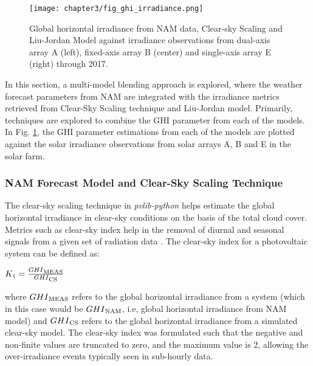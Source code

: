 \begin{figure}[ht]
    \begin{center}
    	\texttt{[image: chapter3/fig\_ghi\_irradiance.png]}
    	\caption[Global horizontal irradiance from NAM data, Clear-sky Scaling and Liu-Jordan against irradiance observations from arrays A, B and E through 2017.]{Global horizontal irradiance from NAM data, Clear-sky Scaling and Liu-Jordan Model against irradiance observations from dual-axis array A (left), fixed-axis array B (center) and single-axis array E (right) through 2017.}
    	\label{fig:fig_ghi_irradiance}
    \end{center}
\end{figure}

\par In this section, a multi-model blending approach is explored, where the weather forecast parameters from NAM are integrated with the irradiance metrics retrieved from Clear-Sky Scaling technique and Liu-Jordan model. Primarily, techniques are explored to combine the GHI parameter from each of the models. In Fig. \ref{fig:fig_ghi_irradiance}, the GHI parameter estimations from each of the models are plotted against the solar irradiance observations from solar arrays A, B and E in the solar farm. 

\subsubsection*{NAM Forecast Model and Clear-Sky Scaling Technique}
The clear-sky scaling technique in \textit{pvlib-python} helps estimate the global horizontal irradiance in clear-sky conditions on the basis of the total cloud cover. Metrics such as clear-sky index help in the removal of diurnal and seasonal signals from a given set of radiation data \cite{expt_clearsky_index}. The clear-sky index for a photovoltaic system can be defined as:\\
\begin{center}
    $K\textsubscript{t} = \frac{GHI\textsubscript{MEAS}}{GHI\textsubscript{CS}}$
\end{center}
where $GHI\textsubscript{MEAS}$ refers to the global horizontal irradiance from a system (which in this case would be $GHI\textsubscript{NAM}$, i.e, global horizontal irradiance from NAM model) and $GHI\textsubscript{CS}$ refers to the global horizontal irradiance from a simulated clear-sky model. The clear-sky index was formulated such that the negative and non-finite values are truncated to zero, and the maximum value is 2, allowing the over-irradiance events typically seen in sub-hourly data.

